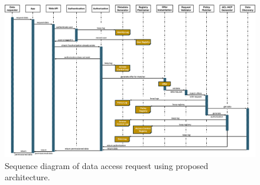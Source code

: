 \begin{landscape}
\begin{figure}[htp]
    \centering
    \includegraphics[width=1\linewidth]{figures//chapter-6/sequence.png}
    \caption{Sequence diagram of data access request using proposed architecture.}
    \label{fig:c4-sequence}
\end{figure}
\end{landscape}